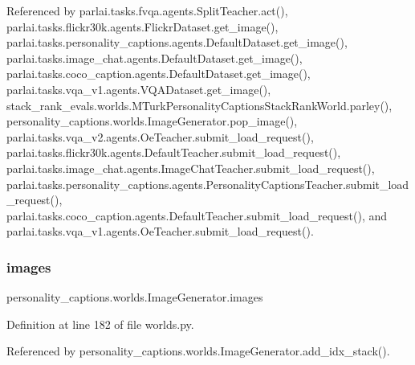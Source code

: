 Referenced by parlai.\+tasks.\+fvqa.\+agents.\+Split\+Teacher.\+act(), parlai.\+tasks.\+flickr30k.\+agents.\+Flickr\+Dataset.\+get\+\_\+image(), parlai.\+tasks.\+personality\+\_\+captions.\+agents.\+Default\+Dataset.\+get\+\_\+image(), parlai.\+tasks.\+image\+\_\+chat.\+agents.\+Default\+Dataset.\+get\+\_\+image(), parlai.\+tasks.\+coco\+\_\+caption.\+agents.\+Default\+Dataset.\+get\+\_\+image(), parlai.\+tasks.\+vqa\+\_\+v1.\+agents.\+V\+Q\+A\+Dataset.\+get\+\_\+image(), stack\+\_\+rank\+\_\+evals.\+worlds.\+M\+Turk\+Personality\+Captions\+Stack\+Rank\+World.\+parley(), personality\+\_\+captions.\+worlds.\+Image\+Generator.\+pop\+\_\+image(), parlai.\+tasks.\+vqa\+\_\+v2.\+agents.\+Oe\+Teacher.\+submit\+\_\+load\+\_\+request(), parlai.\+tasks.\+flickr30k.\+agents.\+Default\+Teacher.\+submit\+\_\+load\+\_\+request(), parlai.\+tasks.\+image\+\_\+chat.\+agents.\+Image\+Chat\+Teacher.\+submit\+\_\+load\+\_\+request(), parlai.\+tasks.\+personality\+\_\+captions.\+agents.\+Personality\+Captions\+Teacher.\+submit\+\_\+load\+\_\+request(), parlai.\+tasks.\+coco\+\_\+caption.\+agents.\+Default\+Teacher.\+submit\+\_\+load\+\_\+request(), and parlai.\+tasks.\+vqa\+\_\+v1.\+agents.\+Oe\+Teacher.\+submit\+\_\+load\+\_\+request().

\mbox{\label{classpersonality__captions_1_1worlds_1_1ImageGenerator_a28a704ac1a923cc558c63ac4bcf2bb65}} 
\subsubsection{\texorpdfstring{images}{images}}
{\footnotesize\ttfamily personality\+\_\+captions.\+worlds.\+Image\+Generator.\+images}



Definition at line 182 of file worlds.\+py.



Referenced by personality\+\_\+captions.\+worlds.\+Image\+Generator.\+add\+\_\+idx\+\_\+stack().

\mbox{\label{classpersonality__captions_1_1worlds_1_1ImageGenerator_a3cb7292fe4be4bd3e9c1e16e763da509}} 
